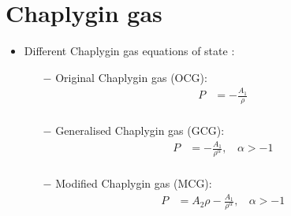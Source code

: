 \documentclass[8pt,hideothersubsections]{beamer}
\begin{document}
\section{Chaplygin gas}
\begin{frame}
\begin{itemize}
\frametitle{\insertsectionhead}
\item Different Chaplygin gas equations of state \citep{kahya2015universe}:
\begin{itemize}
\item[$-$] Original Chaplygin gas (OCG):
\begin{equation}\label{eq:OCG}
\begin{split}
P &= -\frac{A_{1}}{\rho}         \\
\end{split}
\end{equation}
\item[$-$] Generalised Chaplygin gas (GCG):
\begin{equation}\label{eq:GCG}
\begin{split}
P &= -\frac{A_{1}}{\rho^{\alpha}},\ \ \ \ \alpha>-1         \\
\end{split}
\end{equation}
\item[$-$] Modified Chaplygin gas (MCG):
\begin{equation}\label{eq:MCG}
\begin{split}
P &=A_{2}\rho -\frac{A_{1}}{\rho^{\alpha}},\ \ \ \ \alpha>-1        \\
\end{split}
\end{equation}
\end{itemize}
\end{itemize}
\end{frame}
\end{document}

